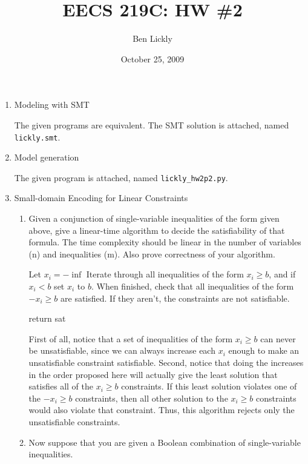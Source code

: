 \documentclass{article}
\title{EECS 219C: HW \#2}
\author{Ben Lickly}
\date{October 25, 2009}
\begin{document}
\maketitle
\begin{enumerate}
  \item Modeling with SMT

The given programs are equivalent.  The SMT solution is attached, named \texttt{lickly.smt}.

  \item Model generation

The given program is attached, named \texttt{lickly\_hw2p2.py}.

  \item Small-domain Encoding for Linear Constraints
    \begin{enumerate}
      \item Given a conjunction of single-variable inequalities of the form given above, give a linear-time algorithm to decide the satisfiability of that formula. The time complexity should be linear in the number of variables (n) and inequalities (m).
Also prove correctness of your algorithm.

Let $x_i = -\inf$
Iterate through all inequalities of the form $x_i \ge b$, and if
$x_i < b$ set $x_i$ to $b$.
When finished, check that all inequalities of the form $- x_i \ge b$ are satisfied.  If they aren't, the constraints are not satisfiable.
\fi
\begin{algorithm}
  return sat \;

\end{algorithm}

First of all, notice that a set of inequalities of the form $x_i \ge b$ can never be unsatisfiable, since we can always increase each $x_i$ enough to make an unsatisfiable constraint satisfiable.  Second, notice that doing the increases in the order proposed here will actually give the least solution that satisfies all of the $x_i \ge b$ constraints.  If this least solution violates one of the $-x_i \ge b$ constraints, then all other solution to the $x_i \ge b$ constraints would also violate that constraint.  Thus, this algorithm rejects only the unsatisfiable constraints.

\item Now suppose that you are given a Boolean combination of single-variable inequalities.


\end{enumerate}
\end{enumerate}
\end{document}
